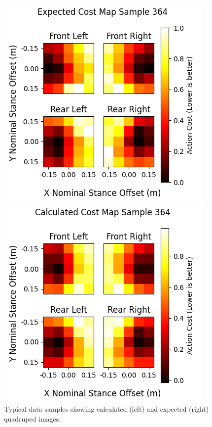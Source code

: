 \begin{figure}
  \centering
  \begin{minipage}[T]{0.45\textwidth}
    \centering
    \includegraphics[width=\textwidth]{images/data/training/typical-expected.png}
  \end{minipage}
  \hfill
  \begin{minipage}[T]{0.45\textwidth}
    \centering
    \includegraphics[width=\textwidth]{images/data/training/typical-calculated.png}
  \end{minipage}
  \hfill

  \caption{Typical data samples showing calculated (left) and
  expected (right) quadruped images.}
  \label{fig:data-cn-typical-data-comparison}
\end{figure}

